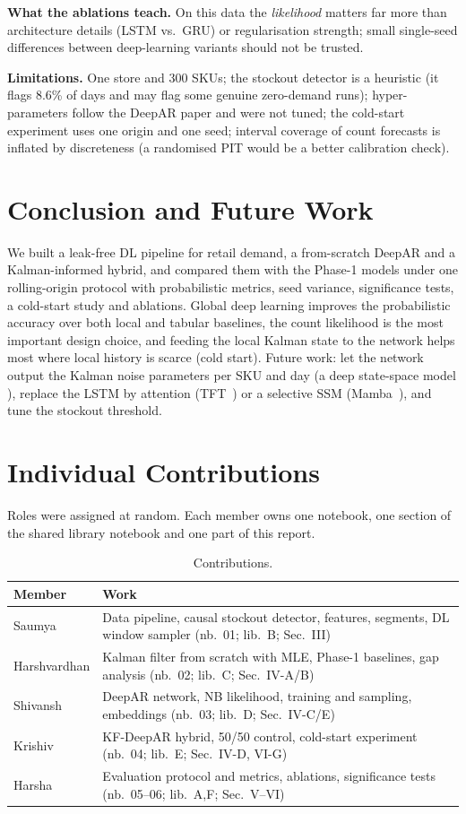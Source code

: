 \documentclass[conference]{IEEEtran}
\begin{document}
\textbf{What the ablations teach.} On this data the \emph{likelihood} matters far more than architecture details (LSTM vs.\ GRU) or
regularisation strength; small single-seed differences between deep-learning variants should not be trusted.

\textbf{Limitations.} One store and 300 SKUs; the stockout detector is a heuristic (it flags 8.6\% of days and may flag some genuine zero-demand
runs); hyper-parameters follow the DeepAR paper and were not tuned; the cold-start experiment uses one origin and one seed; interval coverage of
count forecasts is inflated by discreteness (a randomised PIT would be a better calibration check).

\section{Conclusion and Future Work}
We built a leak-free DL pipeline for retail demand, a from-scratch DeepAR and a Kalman-informed hybrid, and compared them with the Phase-1 models
under one rolling-origin protocol with probabilistic metrics, seed variance, significance tests, a cold-start study and ablations. Global deep
learning improves the probabilistic accuracy over both local and tabular baselines, the count likelihood is the most important design
choice, and feeding the local Kalman state to the network helps most where local history is scarce (cold start). Future work: let the network output the Kalman noise parameters per SKU and day (a deep state-space model
\cite{rangapuram2018dssm}), replace the LSTM by attention (TFT~\cite{lim2021tft}) or a selective SSM (Mamba~\cite{gu2023mamba}), and tune the
stockout threshold.

\appendices
\section{Individual Contributions}
Roles were assigned at random. Each member owns one notebook, one section of the shared library notebook and one part of this report.
\begin{table}[h]
\centering
\caption{Contributions.}
\begin{tabular}{p{1.7cm}p{6.0cm}}
\toprule
Member & Work\\
\midrule
Saumya & Data pipeline, causal stockout detector, features, segments, DL window sampler (nb.~01; lib.~B; Sec.~III)\\
Harshvardhan & Kalman filter from scratch with MLE, Phase-1 baselines, gap analysis (nb.~02; lib.~C; Sec.~IV-A/B)\\
Shivansh & DeepAR network, NB likelihood, training and sampling, embeddings (nb.~03; lib.~D; Sec.~IV-C/E)\\
Krishiv & KF-DeepAR hybrid, 50/50 control, cold-start experiment (nb.~04; lib.~E; Sec.~IV-D, VI-G)\\
Harsha & Evaluation protocol and metrics, ablations, significance tests (nb.~05--06; lib.~A,F; Sec.~V--VI)\\
\bottomrule
\end{tabular}
\end{table}




\end{document}
